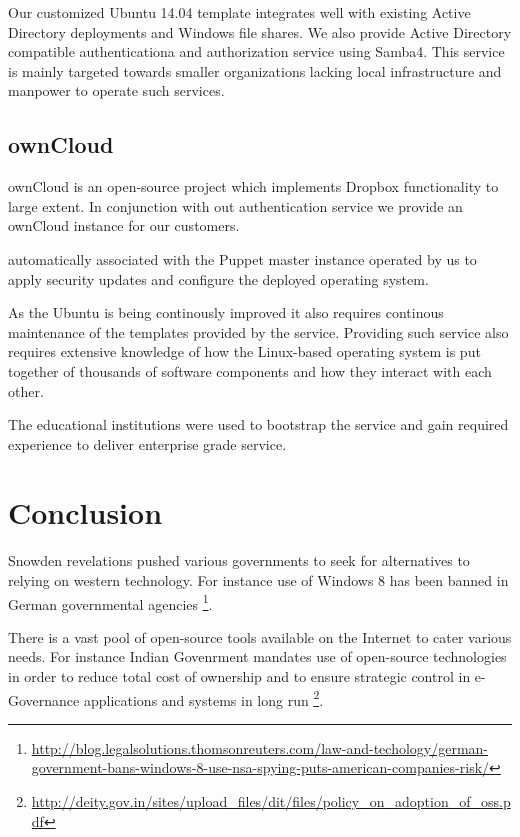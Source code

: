 \documentclass{article}
\begin{document}
Our customized Ubuntu 14.04 template integrates
well with existing Active Directory deployments
and Windows file shares.
We also provide Active Directory compatible
authenticationa and authorization service using Samba4.
This service is mainly targeted towards
smaller organizations lacking local
infrastructure and manpower to operate such services.

\subsection{ownCloud}

ownCloud is an open-source project which implements
Dropbox functionality to large extent.
In conjunction with out authentication service
we provide an ownCloud instance for our customers.



automatically associated with the Puppet master instance 
operated by us to apply security updates and configure the
deployed operating system.



  

As the Ubuntu is being continously improved it also requires
continous maintenance of the templates provided by the service.
Providing such service also requires extensive knowledge of
how the Linux-based operating system is put together of 
thousands of software components and how they interact with each other.


The educational institutions were used to bootstrap the service and gain
required experience to deliver enterprise grade service.



\section{Conclusion}


Snowden revelations pushed various governments to seek for alternatives
to relying on western technology.
For instance use of Windows 8 has been banned in German governmental agencies
\footnote{\url{http://blog.legalsolutions.thomsonreuters.com/law-and-techology/german-government-bans-windows-8-use-nsa-spying-puts-american-companies-risk/}}.

There is a vast pool of open-source tools available on the Internet to cater
various needs.
For instance Indian Govenrment mandates use of open-source technologies
in order to reduce total cost of ownership and to ensure
strategic control in e-Governance applications and systems in long run
\footnote{\url{http://deity.gov.in/sites/upload_files/dit/files/policy_on_adoption_of_oss.pdf}}.




\end{document}
